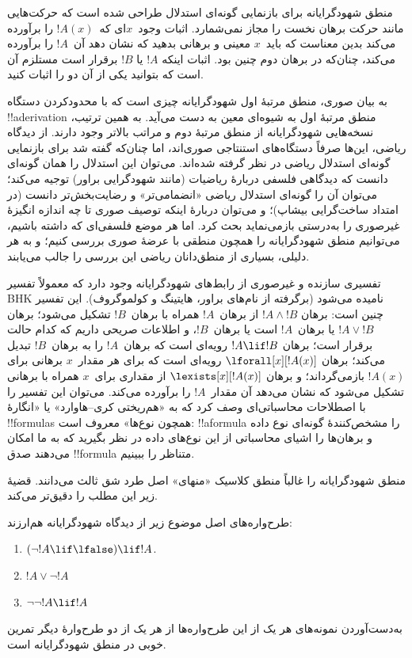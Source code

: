 \documentclass[../../../include/open-logic-section]{subfiles}
\begin{document}
منطق شهودگرایانه برای بازنمایی گونه‌ای استدلال طراحی شده است که حرکت‌هایی
مانند حرکت برهان نخست را مجاز نمی‌شمارد. اثبات وجود~$x$ای که~$!A(x)$
را برآورده می‌کند بدین معناست که باید~$x$ معینی و برهانی بدهید که نشان
دهد آن~$!A$ را برآورده می‌کند، چنان‌که در برهان دوم چنین بود. اثبات
اینکه $!A$ یا $!B$ برقرار است مستلزم آن است که بتوانید یکی از آن دو را
اثبات کنید.

به بیان صوری، منطق مرتبهٔ اول شهودگرایانه چیزی است که با محدودکردن
دستگاه !!a{derivation} منطق مرتبهٔ اول به شیوه‌ای معین به دست می‌آید.
به همین ترتیب، نسخه‌هایی شهودگرایانه از منطق مرتبهٔ دوم و مراتب بالاتر
وجود دارند. از دیدگاه ریاضی، این‌ها صرفاً دستگاه‌های استنتاجی صوری‌اند،
اما چنان‌که گفته شد برای بازنمایی گونه‌ای استدلال ریاضی در نظر گرفته
شده‌اند. می‌توان این استدلال را همان گونه‌ای دانست که دیدگاهی فلسفی
دربارهٔ ریاضیات (مانند شهودگرایی براور) توجیه می‌کند؛ می‌توان آن را
گونه‌ای استدلال ریاضی «انضمامی‌تر» و رضایت‌بخش‌تر دانست (در امتداد
ساخت‌گرایی بیشاپ)؛ و می‌توان دربارهٔ اینکه توصیف صوری تا چه اندازه
انگیزهٔ غیرصوری را به‌درستی بازمی‌نماید بحث کرد. اما هر موضع فلسفی‌ای
که داشته باشیم، می‌توانیم منطق شهودگرایانه را همچون منطقی با عرضهٔ صوری
بررسی کنیم؛ و به هر دلیلی، بسیاری از منطق‌دانان ریاضی این بررسی را
جالب می‌یابند.

تفسیری سازنده و غیرصوری از رابط‌های شهودگرایانه وجود دارد که معمولاً
تفسیر BHK نامیده می‌شود (برگرفته از نام‌های براور، هایتینگ و
کولموگروف). این تفسیر چنین است: برهان $!A \land !B$ از برهان~$!A$ همراه
با برهان~$!B$ تشکیل می‌شود؛ برهان $!A \lor !B$ یا برهان~$!A$ است یا
برهان~$!B$، و اطلاعات صریحی داریم که کدام حالت برقرار است؛ برهان
$!A \lif !B$ رویه‌ای است که برهان~$!A$ را به برهان~$!B$ تبدیل می‌کند؛
برهان $\lforall[x][!A(x)]$ رویه‌ای است که برای هر مقدار~$x$ برهانی برای
$!A(x)$ بازمی‌گرداند؛ و برهان $\lexists[x][!A(x)]$ از مقداری برای~$x$
همراه با برهانی تشکیل می‌شود که نشان می‌دهد آن مقدار~$!A$ را برآورده
می‌کند. می‌توان این تفسیر را با اصطلاحات محاسباتی‌ای وصف کرد که به
«هم‌ریختی کری--هاوارد» یا «انگارهٔ !!{formula}s همچون نوع‌ها» معروف
است: !!a{formula} را مشخص‌کنندهٔ گونه‌ای نوع داده و برهان‌ها را اشیای
محاسباتی از این نوع‌های داده در نظر بگیرید که به ما امکان می‌دهند صدق
!!{formula} متناظر را ببینیم.

منطق شهودگرایانه را غالباً منطق کلاسیک «منهای» اصل طرد شق ثالث
می‌دانند. قضیهٔ زیر این مطلب را دقیق‌تر می‌کند.
\begin{thm}
طرح‌واره‌های اصل موضوع زیر از دیدگاه شهودگرایانه هم‌ارزند:
\begin{enumerate}
\item $(\lnot !A \lif \lfalse) \lif !A$.
\item $!A \lor \lnot !A$
\item $\lnot \lnot !A \lif !A$
\end{enumerate}
\end{thm}
به‌دست‌آوردن نمونه‌های هر یک از این طرح‌واره‌ها از هر یک از دو طرح‌وارهٔ
دیگر تمرین خوبی در منطق شهودگرایانه است.
\end{document}
